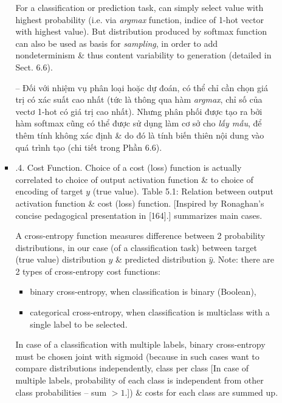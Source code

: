 \documentclass{article}
\begin{document}
\begin{itemize}
\begin{itemize}
\begin{itemize}
			For a classification or prediction task, can simply select value with highest probability (i.e. via {\it argmax} function, indice of 1-hot vector with highest value). But distribution produced by softmax function can also be used as basis for {\it sampling}, in order to add nondeterminism \& thus content variability to generation (detailed in Sect. 6.6).
			
			-- Đối với nhiệm vụ phân loại hoặc dự đoán, có thể chỉ cần chọn giá trị có xác suất cao nhất (tức là thông qua hàm {\it argmax}, chỉ số của vectơ 1-hot có giá trị cao nhất). Nhưng phân phối được tạo ra bởi hàm softmax cũng có thể được sử dụng làm cơ sở cho {\it lấy mẫu}, để thêm tính không xác định \& do đó là tính biến thiên nội dung vào quá trình tạo (chi tiết trong Phần 6.6).
			\item {.4. Cost Function.} Choice of a cost (loss) function is actually correlated to choice of output activation function \& to choice of encoding of target $y$ (true value). {\sf Table 5.1: Relation between output activation function \& cost (loss) function.} [Inspired by {\sc Ronaghan}'s concise pedagogical presentation in [164].] summarizes main cases.
			
			A cross-entropy function measures difference between 2 probability distributions, in our case (of a classification task) between target (true value) distribution $y$ \& predicted distribution $\hat{y}$. Note: there are 2 types of cross-entropy cost functions:
			\begin{itemize}
				\item binary cross-entropy, when classification is binary (Boolean),
				\item categorical cross-entropy, when classification is multiclass with a single label to be selected.
			\end{itemize}
			In case of a classification with multiple labels, binary cross-entropy must be chosen joint with sigmoid (because in such cases want to compare distributions independently, class per class [In case of multiple labels, probability of each class is independent from other class probabilities -- sum $> 1$.]) \& costs for each class are summed up.
			

\end{itemize}
\end{itemize}
\end{itemize}
\end{document}
